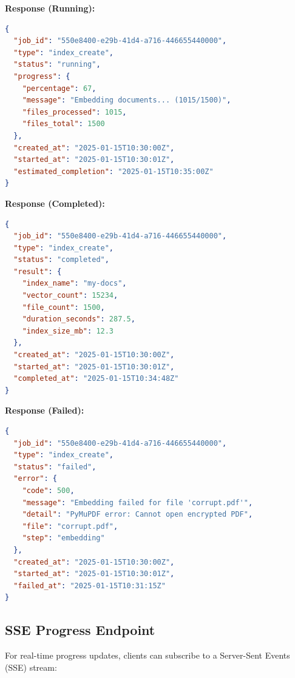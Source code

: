 \documentclass[11pt,a4paper]{article}
\begin{document}
\begin{endpointbox}
\textbf{Response (Running):}
\begin{lstlisting}[language=JSON]
{
  "job_id": "550e8400-e29b-41d4-a716-446655440000",
  "type": "index_create",
  "status": "running",
  "progress": {
    "percentage": 67,
    "message": "Embedding documents... (1015/1500)",
    "files_processed": 1015,
    "files_total": 1500
  },
  "created_at": "2025-01-15T10:30:00Z",
  "started_at": "2025-01-15T10:30:01Z",
  "estimated_completion": "2025-01-15T10:35:00Z"
}
\end{lstlisting}

\textbf{Response (Completed):}
\begin{lstlisting}[language=JSON]
{
  "job_id": "550e8400-e29b-41d4-a716-446655440000",
  "type": "index_create",
  "status": "completed",
  "result": {
    "index_name": "my-docs",
    "vector_count": 15234,
    "file_count": 1500,
    "duration_seconds": 287.5,
    "index_size_mb": 12.3
  },
  "created_at": "2025-01-15T10:30:00Z",
  "started_at": "2025-01-15T10:30:01Z",
  "completed_at": "2025-01-15T10:34:48Z"
}
\end{lstlisting}

\textbf{Response (Failed):}
\begin{lstlisting}[language=JSON]
{
  "job_id": "550e8400-e29b-41d4-a716-446655440000",
  "type": "index_create",
  "status": "failed",
  "error": {
    "code": 500,
    "message": "Embedding failed for file 'corrupt.pdf'",
    "detail": "PyMuPDF error: Cannot open encrypted PDF",
    "file": "corrupt.pdf",
    "step": "embedding"
  },
  "created_at": "2025-01-15T10:30:00Z",
  "started_at": "2025-01-15T10:30:01Z",
  "failed_at": "2025-01-15T10:31:15Z"
}
\end{lstlisting}
\end{endpointbox}

\subsection{SSE Progress Endpoint}

For real-time progress updates, clients can subscribe to a Server-Sent Events (SSE) stream:
\end{document}
